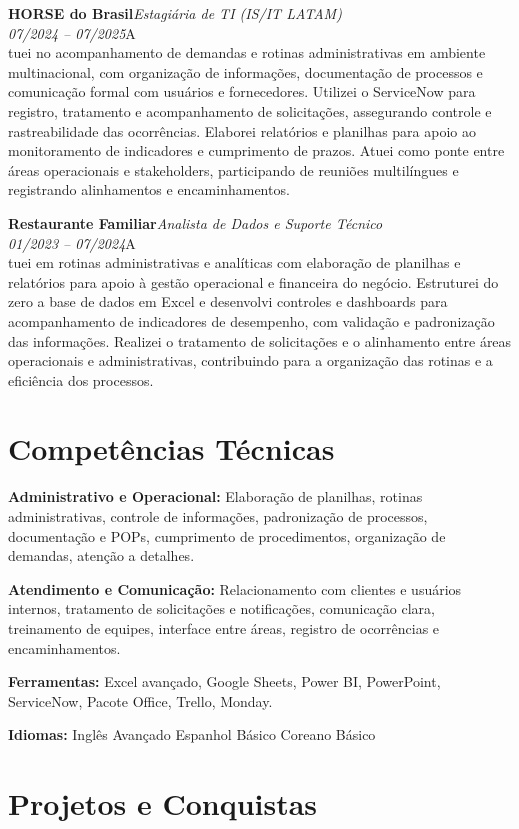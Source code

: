 \documentclass[11pt,a4paper]{article}
\newcommand{\cvrole}[4]{%
  \vspace{4pt}%
  {\bfseries\color{accentcolor}#1}\hfill{\itshape #2}\\[-2pt]%
  {\itshape #3}\hfill #4\\[6pt]%
}
\begin{document}
\cvrole{HORSE do Brasil}{Estagiária de TI (IS/IT LATAM)}{07/2024 -- 07/2025}

Atuei no acompanhamento de demandas e rotinas administrativas em ambiente multinacional, com organização de informações, documentação de processos e comunicação formal com usuários e fornecedores. Utilizei o ServiceNow para registro, tratamento e acompanhamento de solicitações, assegurando controle e rastreabilidade das ocorrências. Elaborei relatórios e planilhas para apoio ao monitoramento de indicadores e cumprimento de prazos. Atuei como ponte entre áreas operacionais e stakeholders, participando de reuniões multilíngues e registrando alinhamentos e encaminhamentos.

\cvrole{Restaurante Familiar}{Analista de Dados e Suporte Técnico}{01/2023 -- 07/2024}

Atuei em rotinas administrativas e analíticas com elaboração de planilhas e relatórios para apoio à gestão operacional e financeira do negócio. Estruturei do zero a base de dados em Excel e desenvolvi controles e dashboards para acompanhamento de indicadores de desempenho, com validação e padronização das informações. Realizei o tratamento de solicitações e o alinhamento entre áreas operacionais e administrativas, contribuindo para a organização das rotinas e a eficiência dos processos.

\section{Competências Técnicas}

\textbf{Administrativo e Operacional:} Elaboração de planilhas, rotinas administrativas, controle de informações, padronização de processos, documentação e POPs, cumprimento de procedimentos, organização de demandas, atenção a detalhes.

\textbf{Atendimento e Comunicação:} Relacionamento com clientes e usuários internos, tratamento de solicitações e notificações, comunicação clara, treinamento de equipes, interface entre áreas, registro de ocorrências e encaminhamentos.

\textbf{Ferramentas:} Excel avançado, Google Sheets, Power BI, PowerPoint, ServiceNow, Pacote Office, Trello, Monday.

\textbf{Idiomas:} Inglês Avançado \enspace\textbullet\enspace Espanhol Básico \enspace\textbullet\enspace Coreano Básico

\section{Projetos e Conquistas}
\end{document}
